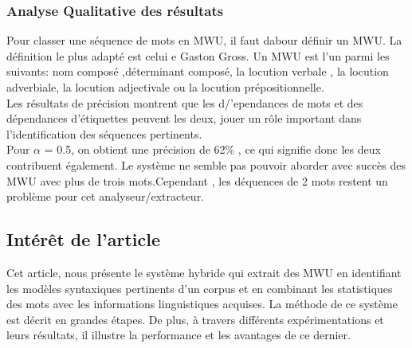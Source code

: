 \documentclass[a4paper,12pt]{article}
\begin{document}
     \subsubsection{Analyse Qualitative des r\'esultats}
   Pour classer une s\'equence de mots en MWU, il faut dabour d\'efinir un MWU. La d\'efinition le plus adapt\'e est celui e Gaston Gross. Un MWU est l'un parmi les suivants: 
   nom compos\'e ,d\'eterminant compos\'e, la locution verbale , la locution adverbiale, la locution adjectivale  ou la locution pr\'epositionnelle.\\
   Les r\'esultats de pr\'ecision montrent que les d/'ependances de mots et des d\'ependances d'\'etiquettes peuvent les deux, jouer un r\^ole important dans l'identification des s\'equences pertinents. \\Pour $\alpha$ = 0.5, on obtient une pr\'ecision de 62\% , ce qui signifie donc les deux contribuent \'egalement.
 Le syst\`eme ne semble pas pouvoir aborder avec succ\`es des MWU avec plus de trois mots.Cependant , les d\'equences de 2 mots restent un probl\`eme pour cet analyseur/extracteur.
 
    \subsection{Intérêt de l'article}

Cet article, nous pr\'esente le syst\`eme hybride qui extrait des MWU en identifiant les mod\`eles syntaxiques pertinents d'un corpus et en combinant les statistiques des mots avec les informations linguistiques acquises. La m\'ethode de ce syst\`eme est d\'ecrit en grandes \'etapes. De plus, \`a travers diff\'erents exp\'erimentations et leurs r\'esultats, il illustre la performance et les avantages de ce dernier.
\end{document}

